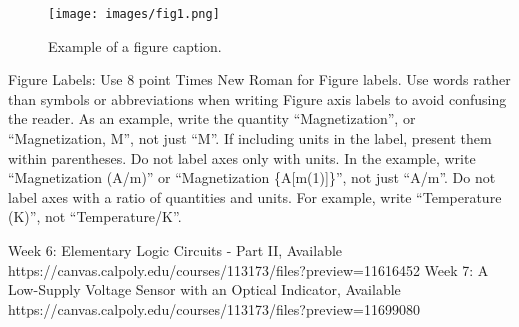 \documentclass[conference]{IEEEtran}
\begin{document}
\begin{figure}[htbp]
\centerline{\texttt{[image: images/fig1.png]}}
\caption{Example of a figure caption.}
\label{fig}
\end{figure}

Figure Labels: Use 8 point Times New Roman for Figure labels. Use words 
rather than symbols or abbreviations when writing Figure axis labels to 
avoid confusing the reader. As an example, write the quantity 
``Magnetization'', or ``Magnetization, M'', not just ``M''. If including 
units in the label, present them within parentheses. Do not label axes only 
with units. In the example, write ``Magnetization (A/m)'' or ``Magnetization 
\{A[m(1)]\}'', not just ``A/m''. Do not label axes with a ratio of 
quantities and units. For example, write ``Temperature (K)'', not 
``Temperature/K''.

\begin{thebibliography}{00}
 Week 6: Elementary Logic Circuits - Part II, Available https://canvas.calpoly.edu/courses/113173/files?preview=11616452
 Week 7: A Low-Supply Voltage Sensor with an Optical Indicator, Available https://canvas.calpoly.edu/courses/113173/files?preview=11699080
\end{thebibliography}
\vspace{12pt}
\end{document}
